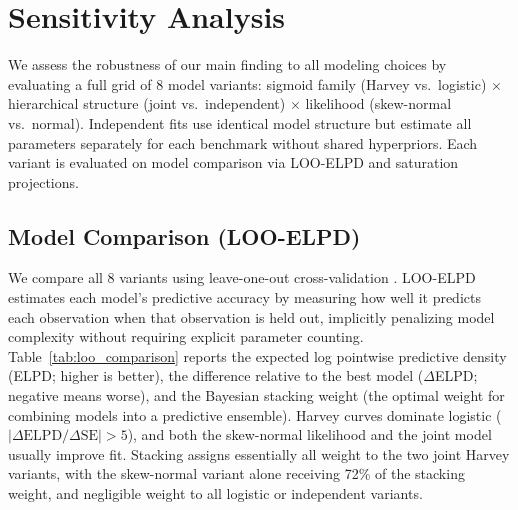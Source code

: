 \documentclass[letterpaper,twocolumn]{article}
\newcommand{\revised}[1]{#1}
\begin{document}
\revised{
\section{Sensitivity Analysis}
\label{app:sensitivity}

We assess the robustness of our main finding to all modeling choices by evaluating a full grid of 8 model variants: sigmoid family (Harvey vs.\ logistic) $\times$ hierarchical structure (joint vs.\ independent) $\times$ likelihood (skew-normal vs.\ normal).} Independent fits use identical model structure but estimate all parameters separately for each benchmark without shared hyperpriors.
 \revised{Each variant is evaluated on model comparison via LOO-ELPD and saturation projections.

\subsection{Model Comparison (LOO-ELPD)}

We compare all 8 variants using leave-one-out cross-validation \citep[LOO;][]{vehtari_practical_2017}. LOO-ELPD estimates each model's predictive accuracy by measuring how well it predicts each observation when that observation is held out, implicitly penalizing model complexity without requiring explicit parameter counting. Table~\ref{tab:loo_comparison} reports the expected log pointwise predictive density (ELPD; higher is better), the difference relative to the best model ($\Delta$ELPD; negative means worse), and the Bayesian stacking weight (the optimal weight for combining models into a predictive ensemble). Harvey curves dominate logistic ($|\Delta\text{ELPD}/\Delta\text{SE}| > 5$), and both the skew-normal likelihood and the joint model usually improve fit. Stacking assigns essentially all weight to the two joint Harvey variants, with the skew-normal variant alone receiving 72\% of the stacking weight, and negligible weight to all logistic or independent variants.

}
\end{document}
